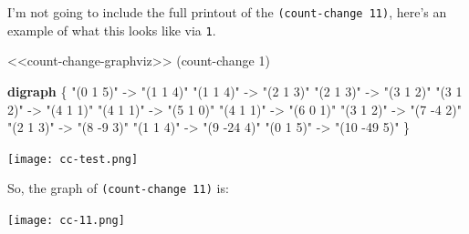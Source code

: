 \documentclass[
]{article}
\newenvironment{Shaded}{}{}
\newcommand{\CommentTok}[1]{\textcolor[rgb]{0.38,0.63,0.69}{\textit{#1}}}
\newcommand{\DecValTok}[1]{\textcolor[rgb]{0.25,0.63,0.44}{#1}}
\newcommand{\KeywordTok}[1]{\textcolor[rgb]{0.00,0.44,0.13}{\textbf{#1}}}
\newcommand{\NormalTok}[1]{#1}
\newcommand{\OtherTok}[1]{\textcolor[rgb]{0.00,0.44,0.13}{#1}}
\newcommand{\StringTok}[1]{\textcolor[rgb]{0.25,0.44,0.63}{#1}}
\begin{document}
I'm not going to include the full printout of the
\texttt{(count-change\ 11)}, here's an example of what this looks like
via \texttt{1}.

\hypertarget{count-change-test}{%
\label{count-change-test}}%
\begin{Shaded}
\begin{Highlighting}[numbers=left,,]
\NormalTok{\textless{}\textless{}count{-}change{-}graphviz\textgreater{}\textgreater{}}
\NormalTok{(count{-}change }\DecValTok{1}\NormalTok{)}
\end{Highlighting}
\end{Shaded}

\begin{Shaded}
\begin{Highlighting}[]
\KeywordTok{digraph} \OtherTok{\{}
\StringTok{"(0 1 5)"}\CommentTok{ }\OtherTok{{-}\textgreater{}}\CommentTok{ }\StringTok{"(1 1 4)"}
\StringTok{"(1 1 4)"}\CommentTok{ }\OtherTok{{-}\textgreater{}}\CommentTok{ }\StringTok{"(2 1 3)"}
\StringTok{"(2 1 3)"}\CommentTok{ }\OtherTok{{-}\textgreater{}}\CommentTok{ }\StringTok{"(3 1 2)"}
\StringTok{"(3 1 2)"}\CommentTok{ }\OtherTok{{-}\textgreater{}}\CommentTok{ }\StringTok{"(4 1 1)"}
\StringTok{"(4 1 1)"}\CommentTok{ }\OtherTok{{-}\textgreater{}}\CommentTok{ }\StringTok{"(5 1 0)"}
\StringTok{"(4 1 1)"}\CommentTok{ }\OtherTok{{-}\textgreater{}}\CommentTok{ }\StringTok{"(6 0 1)"}
\StringTok{"(3 1 2)"}\CommentTok{ }\OtherTok{{-}\textgreater{}}\CommentTok{ }\StringTok{"(7 {-}4 2)"}
\StringTok{"(2 1 3)"}\CommentTok{ }\OtherTok{{-}\textgreater{}}\CommentTok{ }\StringTok{"(8 {-}9 3)"}
\StringTok{"(1 1 4)"}\CommentTok{ }\OtherTok{{-}\textgreater{}}\CommentTok{ }\StringTok{"(9 {-}24 4)"}
\StringTok{"(0 1 5)"}\CommentTok{ }\OtherTok{{-}\textgreater{}}\CommentTok{ }\StringTok{"(10 {-}49 5)"}
\OtherTok{\}}
\end{Highlighting}
\end{Shaded}

\texttt{[image: cc-test.png]}

So, the graph of \texttt{(count-change\ 11)} is:

\texttt{[image: cc-11.png]}
\end{document}
